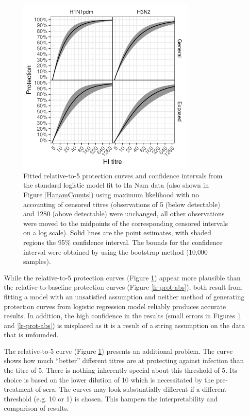 \begin{figure}[htp]
	\centering
	\includegraphics[width=0.8\textwidth]{../fit-logistic-boot-plot/hanam-hi-prot-rel.pdf}
	\caption{
		Fitted relative-to-5 protection curves and confidence intervals from the standard logistic model fit to Ha Nam data (also shown in Figure \ref{HanamCounts}) using maximum likelihood with no accounting of censored titres (observations of 5 (below detectable) and 1280 (above detectable) were unchanged, all other observations were moved to the midpoints of the corresponding censored intervals on a log scale). Solid lines are the point estimates, with shaded regions the 95\% confidence interval. The bounds for the confidence interval were obtained by using the bootstrap method (10,000 samples).
	}
	\label{lr-prot-rel}
\end{figure}

While the relative-to-5 protection curves (Figure \ref{lr-prot-rel}) appear more plausible than the relative-to-baseline protection curves (Figure \ref{lr-prot-abs}), both result from fitting a model with an unsatisfied assumption and neither method of generating protection curves from logistic regression model reliably produces accurate results. In addition, the high confidence in the results (small errors in Figures \ref{lr-prot-rel} and \ref{lr-prot-abs}) is misplaced as it is a result of a string assumption on the data that is unfounded.

The relative-to-5 curve (Figure \ref{lr-prot-rel}) presents an additional problem. The curve shows how much ``better'' different titres are at protecting against infection than the titre of 5.
There is nothing inherently special about this threshold of 5. Its choice is based on the lower dilution of 10 which is necessitated by the pre-treatment of sera. The curves may look substantially different if a different threshold (e.g. 10 or 1) is chosen. This hampers the interpretability and comparison of results.
